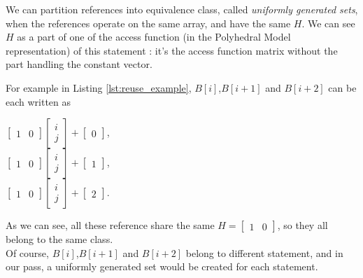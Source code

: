 \documentclass[paper=a4, fontsize=11pt]{scrartcl}
\numberwithin{equation}{section}        %
\numberwithin{figure}{section}          %
\numberwithin{table}{section}               %
\begin{document}
            We can partition references into equivalence class, called \textit{uniformly generated sets},
            when the references operate on the same array, and have the same $H$.
            We can see $H$ as a part of one of the access function (in the Polyhedral Model representation) of this statement :
            it's the access function matrix without the part handling the constant vector.

            For example in Listing \ref{lst:reuse_example}, $B[i]$,$B[i+1]$ and $B[i+2]$ can be each written as
            \begin{center}
                $
                \begin{bmatrix}
                    1 & 0
                \end{bmatrix}
                \begin{bmatrix}
                    i\\
                    j
                \end{bmatrix}
                +
                \begin{bmatrix}
                    0
                \end{bmatrix}
                $,\\
                $
                \begin{bmatrix}
                    1 & 0
                \end{bmatrix}
                \begin{bmatrix}
                    i\\
                    j
                \end{bmatrix}
                +
                \begin{bmatrix}
                    1
                \end{bmatrix}
                $,\\
                $
                \begin{bmatrix}
                    1 & 0
                \end{bmatrix}
                \begin{bmatrix}
                    i\\
                    j
                \end{bmatrix}
                +
                \begin{bmatrix}
                    2
                \end{bmatrix}
                $.
            \end{center}
            As we can see, all these reference share the same $H=\begin{bmatrix}1 & 0\end{bmatrix}$,
            so they all belong to the same class.\\
            Of course, $B[i]$,$B[i+1]$ and $B[i+2]$ belong to different statement, and in
            our pass, a uniformly generated set would be created for each statement.
\end{document}

